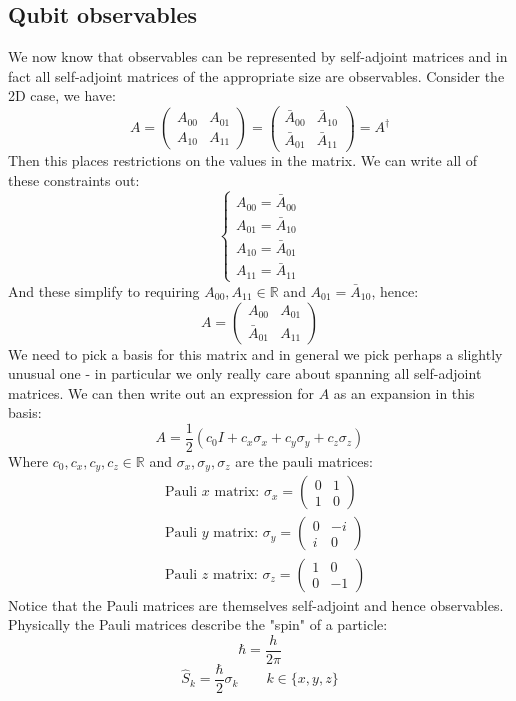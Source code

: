 \documentclass[12pt]{article}
\begin{document}
\subsection*{Qubit observables}
We now know that observables can be represented by self-adjoint matrices and in fact all self-adjoint matrices of the appropriate size are observables. Consider the 2D case, we have:
\[A=\begin{pmatrix}
    A_{00} & A_{01} \\
    A_{10} & A_{11}
\end{pmatrix}=\begin{pmatrix}
    \bar{A}_{00} & \bar{A}_{10} \\
    \bar{A}_{01} & \bar{A}_{11}
\end{pmatrix}=A^\dagger\]
Then this places restrictions on the values in the matrix. We can write all of these constraints out:
\[\begin{cases}
    A_{00}=\bar{A}_{00} \\
    A_{01} = \bar{A}_{10} \\
    A_{10} = \bar{A}_{01} \\
    A_{11} = \bar{A}_{11}
\end{cases}\]
And these simplify to requiring \(A_{00},A_{11}\in\mathbb{R}\) and \(A_{01}=\bar{A}_{10}\), hence:
\[A=\begin{pmatrix}
    A_{00} & A_{01} \\
    \bar{A}_{01} & A_{11}
\end{pmatrix}\]
We need to pick a basis for this matrix and in general we pick perhaps a slightly unusual one - in particular we only really care about spanning all self-adjoint matrices. We can then write out an expression for \(A\) as an expansion in this basis:
\[A=\frac{1}{2}(c_0I+c_x\sigma_x+c_y\sigma_y+c_z\sigma_z)\]
Where \(c_0,c_x,c_y,c_z\in\mathbb{R}\) and \(\sigma_x,\sigma_y,\sigma_z\) are the pauli matrices:
\begin{align*}
    &\text{Pauli }x \text{ matrix: }\sigma_x=\begin{pmatrix}
        0 & 1 \\
        1 & 0
    \end{pmatrix} \\
        &\text{Pauli }y \text{ matrix: }\sigma_y=\begin{pmatrix}
        0 & -i \\
        i & 0
    \end{pmatrix} \\
        &\text{Pauli }z \text{ matrix: }\sigma_z=\begin{pmatrix}
        1 & 0\\
        0 & -1
    \end{pmatrix}
\end{align*}
Notice that the Pauli matrices are themselves self-adjoint and hence observables. Physically the Pauli matrices describe the "spin" of a particle:
\[\hbar=\frac{h}{2\pi}\]
\[\hat{S}_k=\frac{\hbar}{2}\sigma_k\qquad k\in\{x,y,z\}\]
\end{document}
